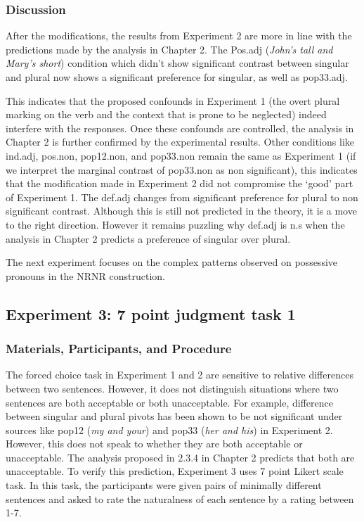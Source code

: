 \documentclass[
  11pt          %
  ,letterpaper  %
  ,center       %
  ,noupper      %
  ]{uconnthesis2}
\begin{document}
\subsubsection{Discussion}

After the modifications, the results from Experiment 2 are more in line with the predictions made by the analysis in Chapter 2. The Pos.adj (\textit{John's tall and Mary's short}) condition which didn't show significant contrast between singular and plural now shows a significant preference for singular, as well as pop33.adj. 


This indicates that the proposed confounds in Experiment 1 (the overt plural marking on the verb and the context that is prone to be neglected) indeed interfere with the responses. Once these confounds are controlled, the analysis in Chapter 2 is further confirmed by the experimental results. Other conditions like ind.adj, pos.non, pop12.non, and pop33.non remain the same as Experiment 1 (if we interpret the marginal contrast of pop33.non as non significant), this indicates that the modification made in Experiment 2 did not compromise the `good' part of Experiment 1. The def.adj changes from significant preference for plural to non significant contrast. Although this is still not predicted in the theory, it is a move to the right direction. However it remains puzzling why def.adj is n.s when the analysis in Chapter 2 predicts a preference of singular over plural.

The next experiment focuses on the complex patterns observed on possessive pronouns in the NRNR construction.

\subsection{Experiment 3: 7 point judgment task 1}

\subsubsection{Materials, Participants, and Procedure}

The forced choice task in Experiment 1 and 2 are sensitive to relative differences between two sentences. However, it does not distinguish situations where two sentences are both acceptable or both unacceptable. For example, difference between singular and plural pivots has been shown to be not significant under sources like pop12 (\textit{my and your}) and pop33 (\textit{her and his}) in Experiment 2. However, this does not speak to whether they are both acceptable or unacceptable. The analysis proposed in 2.3.4 in Chapter 2 predicts that both are unacceptable. To verify this prediction, Experiment 3 uses 7 point Likert scale task. In this task, the participants were given pairs of minimally different sentences and asked to rate the naturalness of each sentence by a rating between 1-7. 
\end{document}
